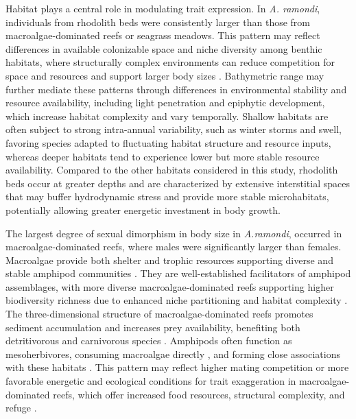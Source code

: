 \documentclass[journal,article,submit,pdftex,moreauthors]{Definitions/mdpi}
\begin{document}
    		Habitat plays a central role in modulating trait expression. In \textit{A. ramondi}, individuals from rhodolith beds were consistently larger than those from macroalgae-dominated reefs or seagrass meadows. This pattern may reflect differences in available colonizable space and niche diversity among benthic habitats, where structurally complex environments can reduce competition for space and resources and support larger body sizes \citep{navarro2025inside}. Bathymetric range may further mediate these patterns through differences in environmental stability and resource availability, including light penetration and epiphytic development, which increase habitat complexity and vary temporally. Shallow habitats are often subject to strong intra-annual variability, such as winter storms and swell, favoring species adapted to fluctuating habitat structure and resource inputs, whereas deeper habitats tend to experience lower but more stable resource availability. Compared to the other habitats considered in this study, rhodolith beds occur at greater depths and are characterized by extensive interstitial spaces \citep{cabrito2024morphological} that may buffer hydrodynamic stress and provide more stable microhabitats, potentially allowing greater energetic investment in body growth.
    		
    		The largest degree of sexual dimorphism in body size in \textit{A.ramondi}, occurred in macroalgae-dominated reefs, where males were significantly larger than females. Macroalgae provide both shelter \citep{lippert2001macrofauna} and trophic resources supporting diverse and stable amphipod communities \citep{hughes2004}. They are well-established facilitators of amphipod assemblages, with more diverse macroalgae-dominated reefs supporting higher biodiversity richness due to enhanced niche partitioning and habitat complexity \citep{ferreira2025}. The three-dimensional structure of macroalgae-dominated reefs promotes sediment accumulation and increases prey availability, benefiting both detritivorous and carnivorous species \citep{edgar1993resource}. Amphipods often function as mesoherbivores, consuming macroalgae directly \citep{poore2012global}, and forming close associations with these habitats \citep{leite2007}. This pattern may reflect higher mating competition or more favorable energetic and ecological conditions for trait exaggeration in macroalgae-dominated reefs, which offer increased food resources, structural complexity, and refuge \citep{edgar1993resource, ferreira2025}.
    		
\end{document}
